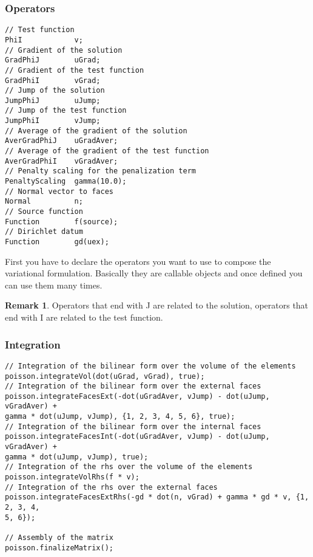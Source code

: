 \documentclass[12pt, a4paper]{article}
\newcommand{\code}[1]{{\footnotesize\ttfamily #1}}
\theoremstyle{definition}
\newtheorem*{remark}{Remark}
\begin{document}
\subsubsection{Operators}
\begin{lstlisting}
// Test function
PhiI            v;
// Gradient of the solution
GradPhiJ        uGrad;
// Gradient of the test function
GradPhiI        vGrad;
// Jump of the solution
JumpPhiJ        uJump;
// Jump of the test function
JumpPhiI        vJump;
// Average of the gradient of the solution
AverGradPhiJ    uGradAver;
// Average of the gradient of the test function
AverGradPhiI    vGradAver;
// Penalty scaling for the penalization term
PenaltyScaling  gamma(10.0);
// Normal vector to faces
Normal          n;
// Source function
Function        f(source);
// Dirichlet datum
Function        gd(uex);
\end{lstlisting}
First you have to declare the operators you want to use to compose the
variational formulation. Basically they are callable objects and once defined
you can use them many times.\\
\begin{remark}
Operators that end with \code{J} are related to the solution, operators
that end with \code{I} are related to the test function.
\end{remark}

\subsubsection{Integration}
\begin{lstlisting}
// Integration of the bilinear form over the volume of the elements
poisson.integrateVol(dot(uGrad, vGrad), true);
// Integration of the bilinear form over the external faces
poisson.integrateFacesExt(-dot(uGradAver, vJump) - dot(uJump, vGradAver) + 
gamma * dot(uJump, vJump), {1, 2, 3, 4, 5, 6}, true);
// Integration of the bilinear form over the internal faces
poisson.integrateFacesInt(-dot(uGradAver, vJump) - dot(uJump, vGradAver) + 
gamma * dot(uJump, vJump), true);
// Integration of the rhs over the volume of the elements
poisson.integrateVolRhs(f * v);
// Integration of the rhs over the external faces
poisson.integrateFacesExtRhs(-gd * dot(n, vGrad) + gamma * gd * v, {1, 2, 3, 4, 
5, 6});

// Assembly of the matrix
poisson.finalizeMatrix();
\end{lstlisting}
\end{document}
